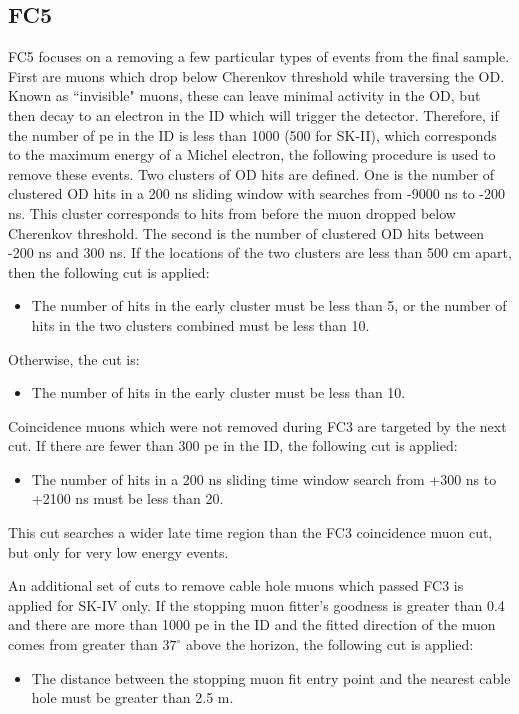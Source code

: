 \subsection{FC5}
FC5 focuses on a removing a few particular types of events from the final sample.  First are muons which drop below Cherenkov threshold while traversing the OD.  Known as ``invisible" muons, these can leave minimal activity in the OD, but then decay to an electron in the ID which will trigger the detector.   Therefore, if the number of pe in the ID is less than 1000 (500 for SK-II), which corresponds to the maximum energy of a Michel electron, the following procedure is used to remove these events.  Two clusters of OD hits are defined.  One is the number of clustered OD hits in a 200 ns sliding window with searches from -9000 ns to -200 ns.  This cluster corresponds to hits from before the muon dropped below Cherenkov threshold.  The second is the number of clustered OD hits between -200 ns and 300 ns.  If the locations of the two clusters are less than 500 cm apart, then the following cut is applied:
\begin{itemize}
\item The number of hits in the early cluster must be less than 5, or the number of hits in the two clusters combined must be less than 10.
\end{itemize}
Otherwise, the cut is:
\begin{itemize}
\item The number of hits in the early cluster must be less than 10.
\end{itemize}
\par
Coincidence muons which were not removed during FC3 are targeted by the next cut.  If there are fewer than 300 pe in the ID, the following cut is applied:
\begin{itemize}
\item The number of hits in a 200 ns sliding time window search from +300 ns to +2100 ns must be less than 20.
\end{itemize}
This cut searches a wider late time region than the FC3 coincidence muon cut, but only for very low energy events.
\par
An additional set of cuts to remove cable hole muons which passed FC3 is applied for SK-IV only.  If the stopping muon fitter's goodness is greater than 0.4 and there are more than 1000 pe in the ID and the fitted direction of the muon comes from greater than $37^\circ$ above the horizon, the following cut is applied:
\begin{itemize}
\item The distance between the stopping muon fit entry point and the nearest cable hole must be greater than 2.5 m.
\end{itemize}
